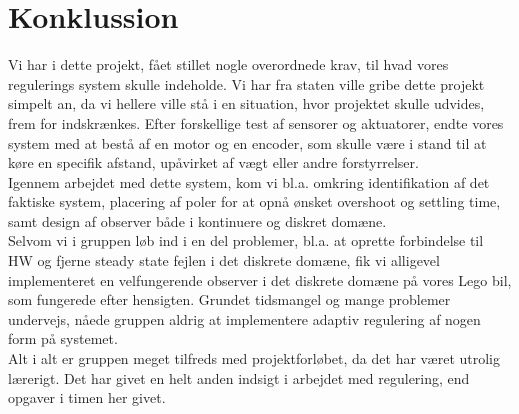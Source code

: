 \graphicspath{{Chapters/Konklussion/}}

\section{Konklussion}

Vi har i dette projekt, fået stillet nogle overordnede krav, til hvad vores regulerings system skulle indeholde. Vi har fra staten ville gribe dette projekt simpelt an, da vi hellere ville stå i en situation, hvor projektet skulle udvides, frem for indskrænkes. Efter forskellige test af sensorer og aktuatorer, endte vores system med at bestå af en motor og en encoder, som skulle være i stand til at køre en specifik afstand, upåvirket af vægt eller andre forstyrrelser.\\
Igennem arbejdet med dette system, kom vi bl.a. omkring identifikation af det faktiske system, placering af poler for at opnå ønsket overshoot og settling time, samt design af observer både i kontinuere og diskret domæne. \\
Selvom vi i gruppen løb ind i en del problemer, bl.a. at oprette forbindelse til HW og fjerne steady state fejlen i det diskrete domæne, fik vi alligevel implementeret en velfungerende observer i det diskrete domæne på vores Lego bil, som fungerede efter hensigten. Grundet tidsmangel og mange problemer undervejs, nåede gruppen aldrig at implementere adaptiv regulering af nogen form på systemet. \\
Alt i alt er gruppen meget tilfreds med projektforløbet, da det har været utrolig lærerigt. Det har givet en helt anden indsigt i arbejdet med regulering, end opgaver i timen her givet. 




